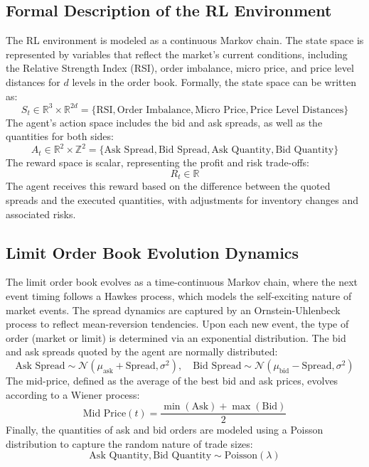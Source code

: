 \documentclass{article}
\begin{document}
\subsection{Formal Description of the RL Environment}
The RL environment is modeled as a continuous Markov chain. The state space is represented by variables that reflect the market's current conditions, including the Relative Strength Index (RSI), order imbalance, micro price, and price level distances for \(d\) levels in the order book. Formally, the state space can be written as:
\[
S_t \in \mathbb{R}^3 \times \mathbb{R}^{2d} = \{\text{RSI}, \text{Order Imbalance}, \text{Micro Price}, \text{Price Level Distances}\}
\]
The agent's action space includes the bid and ask spreads, as well as the quantities for both sides:
\[
A_t \in \mathbb{R}^2 \times \mathbb{Z}^2 = \{\text{Ask Spread}, \text{Bid Spread}, \text{Ask Quantity}, \text{Bid Quantity}\}
\]
The reward space is scalar, representing the profit and risk trade-offs:
\[
R_t \in \mathbb{R}
\]
The agent receives this reward based on the difference between the quoted spreads and the executed quantities, with adjustments for inventory changes and associated risks.

\subsection{Limit Order Book Evolution Dynamics}
The limit order book evolves as a time-continuous Markov chain, where the next event timing follows a Hawkes process, which models the self-exciting nature of market events. The spread dynamics are captured by an Ornstein-Uhlenbeck process to reflect mean-reversion tendencies. Upon each new event, the type of order (market or limit) is determined via an exponential distribution. The bid and ask spreads quoted by the agent are normally distributed:
\[
\text{Ask Spread} \sim \mathcal{N}(\mu_{\text{ask}} + \text{Spread}, \sigma^2), \quad \text{Bid Spread} \sim \mathcal{N}(\mu_{\text{bid}} - \text{Spread}, \sigma^2)
\]
The mid-price, defined as the average of the best bid and ask prices, evolves according to a Wiener process:
\[
\text{Mid Price}(t) = \frac{\min(\text{Ask}) + \max(\text{Bid})}{2}
\]
Finally, the quantities of ask and bid orders are modeled using a Poisson distribution to capture the random nature of trade sizes:
\[
\text{Ask Quantity}, \text{Bid Quantity} \sim \text{Poisson}(\lambda)
\]
\end{document}
